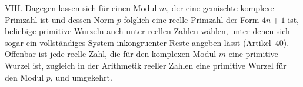VIII. Dagegen lassen sich für einen Modul $m$, der eine gemischte komplexe Primzahl ist und dessen Norm $p$ folglich eine reelle Primzahl der Form \mbox{$4n+1$} ist, beliebige primitive Wurzeln auch unter reellen Zahlen wählen, unter denen sich sogar ein vollständiges System inkongruenter Reste angeben lässt (Artikel~40). Offenbar ist jede reelle Zahl, die für den komplexen Modul $m$ eine primitive Wurzel ist, zugleich in der Arithmetik reeller Zahlen eine primitive Wurzel für den Modul $p$, und umgekehrt.

